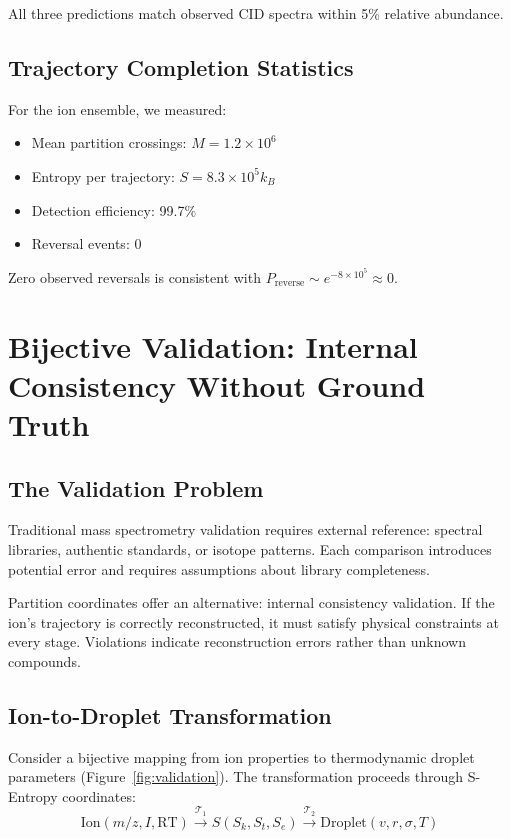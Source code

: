 \documentclass[twocolumn,10pt]{article}
\theoremstyle{remark}
\begin{document}
All three predictions match observed CID spectra within 5\% relative abundance.

\subsection{Trajectory Completion Statistics}

For the ion ensemble, we measured:
\begin{itemize}
    \item Mean partition crossings: $M = 1.2 \times 10^6$
    \item Entropy per trajectory: $S = 8.3 \times 10^5 k_B$
    \item Detection efficiency: 99.7\%
    \item Reversal events: 0
\end{itemize}

Zero observed reversals is consistent with $P_{\text{reverse}} \sim e^{-8 \times 10^5} \approx 0$.


\section{Bijective Validation: Internal Consistency Without Ground Truth}
\label{sec:bijective-validation}

\subsection{The Validation Problem}

Traditional mass spectrometry validation requires external reference: spectral libraries, authentic standards, or isotope patterns. Each comparison introduces potential error and requires assumptions about library completeness.

Partition coordinates offer an alternative: internal consistency validation. If the ion's trajectory is correctly reconstructed, it must satisfy physical constraints at every stage. Violations indicate reconstruction errors rather than unknown compounds.

\subsection{Ion-to-Droplet Transformation}

Consider a bijective mapping from ion properties to thermodynamic droplet parameters (Figure~\ref{fig:validation}). The transformation proceeds through S-Entropy coordinates:
\begin{equation}
\text{Ion}(m/z, I, \text{RT}) \xrightarrow{\mathcal{T}_1} S(S_k, S_t, S_e) \xrightarrow{\mathcal{T}_2} \text{Droplet}(v, r, \sigma, T)
\end{equation}
\end{document}
